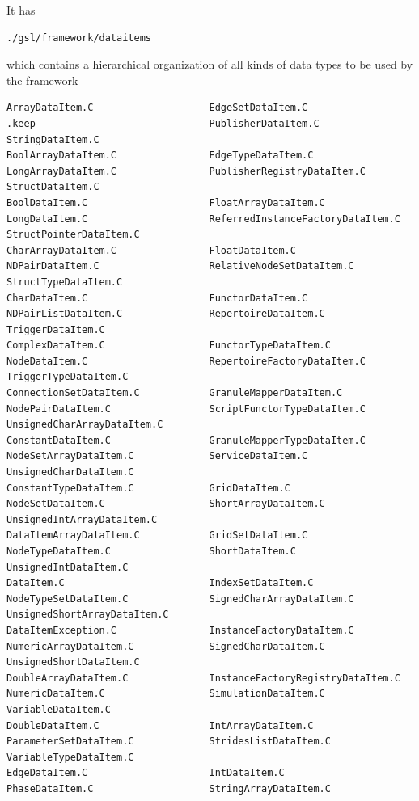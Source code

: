 It has
\begin{verbatim}
./gsl/framework/dataitems
\end{verbatim}
which contains a hierarchical organization of all kinds of data types to 
be used by the framework

{\tiny
\begin{verbatim}
ArrayDataItem.C                    EdgeSetDataItem.C                  .keep                              PublisherDataItem.C                StringDataItem.C
BoolArrayDataItem.C                EdgeTypeDataItem.C                 LongArrayDataItem.C                PublisherRegistryDataItem.C        StructDataItem.C
BoolDataItem.C                     FloatArrayDataItem.C               LongDataItem.C                     ReferredInstanceFactoryDataItem.C  StructPointerDataItem.C
CharArrayDataItem.C                FloatDataItem.C                    NDPairDataItem.C                   RelativeNodeSetDataItem.C          StructTypeDataItem.C
CharDataItem.C                     FunctorDataItem.C                  NDPairListDataItem.C               RepertoireDataItem.C               TriggerDataItem.C
ComplexDataItem.C                  FunctorTypeDataItem.C              NodeDataItem.C                     RepertoireFactoryDataItem.C        TriggerTypeDataItem.C
ConnectionSetDataItem.C            GranuleMapperDataItem.C            NodePairDataItem.C                 ScriptFunctorTypeDataItem.C        UnsignedCharArrayDataItem.C
ConstantDataItem.C                 GranuleMapperTypeDataItem.C        NodeSetArrayDataItem.C             ServiceDataItem.C                  UnsignedCharDataItem.C
ConstantTypeDataItem.C             GridDataItem.C                     NodeSetDataItem.C                  ShortArrayDataItem.C               UnsignedIntArrayDataItem.C
DataItemArrayDataItem.C            GridSetDataItem.C                  NodeTypeDataItem.C                 ShortDataItem.C                    UnsignedIntDataItem.C
DataItem.C                         IndexSetDataItem.C                 NodeTypeSetDataItem.C              SignedCharArrayDataItem.C          UnsignedShortArrayDataItem.C
DataItemException.C                InstanceFactoryDataItem.C          NumericArrayDataItem.C             SignedCharDataItem.C               UnsignedShortDataItem.C
DoubleArrayDataItem.C              InstanceFactoryRegistryDataItem.C  NumericDataItem.C                  SimulationDataItem.C               VariableDataItem.C
DoubleDataItem.C                   IntArrayDataItem.C                 ParameterSetDataItem.C             StridesListDataItem.C              VariableTypeDataItem.C
EdgeDataItem.C                     IntDataItem.C                      PhaseDataItem.C                    StringArrayDataItem.C              
\end{verbatim}
}

